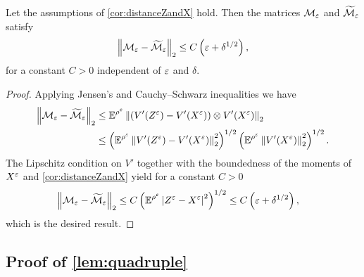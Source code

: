 \documentclass[review,onefignum,onetabnum]{siamonline190516}
\begin{document}
\begin{appendices}
\begin{lemma}\label{lem:distanceMandTildeM} Let the assumptions of \cref{cor:distanceZandX} hold. Then the matrices $\mathcal M_\varepsilon$ and $\widetilde{\mathcal M}_\varepsilon$ satisfy
	\begin{equation}
	\left\|\mathcal M_\varepsilon - \widetilde{\mathcal M}_\varepsilon\right\|_2 \leq C\left(\varepsilon + \delta^{1/2}\right),
	\end{equation}
	for a constant $C > 0$ independent of $\varepsilon$ and $\delta$.
\end{lemma}
\begin{proof} Applying Jensen's and Cauchy--Schwarz inequalities we have
	\begin{equation}
	\begin{aligned}
	\left\|\mathcal M_\varepsilon - \widetilde{\mathcal M}_\varepsilon\right\|_2 &\leq \operatorname{\mathbb{E}}^{\rho^\varepsilon} \left\|\left(V'(Z^\varepsilon) - V'(X^\varepsilon)\right) \otimes V'(X^\varepsilon)\right\|_2 \\
	&\leq \left(\operatorname{\mathbb{E}}^{\rho^\varepsilon}\left\|V'(Z^\varepsilon) - V'(X^\varepsilon)\right\|_2^2\right)^{1/2} \left(\operatorname{\mathbb{E}}^{\rho^\varepsilon} \left\|V'(X^\varepsilon)\right\|_2^{2}\right)^{1/2}.
	\end{aligned}
	\end{equation}
	The Lipschitz condition on $V'$ together with the boundedness of the moments of $X^\varepsilon$ and \cref{cor:distanceZandX} yield for a constant $C > 0$
	\begin{equation}
	\begin{aligned}
	\left\|\mathcal M_\varepsilon - \widetilde{\mathcal M}_\varepsilon\right\|_2 &\leq C\left(\operatorname{\mathbb{E}}^{\rho^\varepsilon}\left\lvert Z^\varepsilon - X^\varepsilon\right\rvert^{2}\right)^{1/2} \leq C \left(\varepsilon + \delta^{1/2} \right),
	\end{aligned}
	\end{equation}
	which is the desired result.
\end{proof}

\subsection{Proof of \cref{lem:quadruple}}


\end{appendices}
\end{document}
